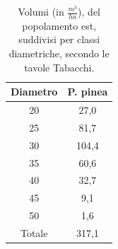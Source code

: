 \begin{table}[H]
\caption{Volumi (in $\frac{m^3}{ha}$), del popolamento est, suddivisi per classi diametriche, secondo le tavole Tabacchi.}
\centering
\begin{tabular}{cc}
\toprule
Diametro & P. pinea \\
\midrule
20       & 27,0    \\
25       & 81,7     \\
30       & 104,4     \\
35       & 60,6    \\
40       & 32,7    \\
45       & 9,1    \\
50       & 1,6  \\
\midrule
Totale & 317,1 \\
\bottomrule
\end{tabular}
\label{tab:volumi_tabacchi_ettaro_est}
\end{table}